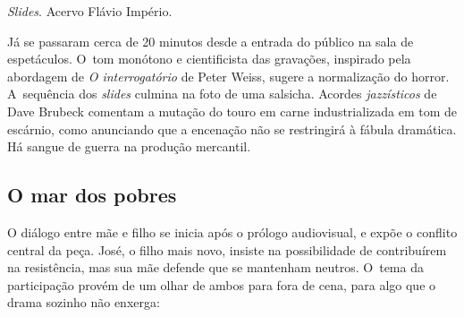 
{}%
{}%
{}%
{}%
{}%
{}%
{}%
{}%
{}%
{}%
{}%
{}%

{\it Slides}. Acervo Flávio Império.

Já se passaram cerca de 20 minutos desde a entrada do público na sala de
espetáculos. O~tom monótono e cientificista das gravações, inspirado
pela abordagem de {\it O interrogatório} de Peter Weiss, sugere a
normalização do horror. A~sequência dos {\it slides} culmina na foto de
uma salsicha. Acordes {\it jazzísticos} de Dave Brubeck comentam a
mutação do touro em carne industrializada em tom de escárnio, como
anunciando que a encenação não se restringirá à fábula dramática. Há
sangue de guerra na produção mercantil.

\subsection{O mar dos pobres}

O diálogo entre mãe e filho se inicia após o prólogo audiovisual, e
expõe o conflito central da peça. José, o filho mais novo, insiste na
possibilidade de contribuírem na resistência, mas sua mãe defende que se
mantenham neutros. O~tema da participação provém de um olhar de ambos
para fora de cena, para algo que o drama sozinho não enxerga:


